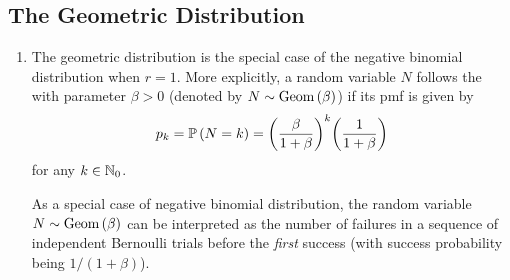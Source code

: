 \subsection{The Geometric Distribution}
\begin{enumerate}
\item The geometric distribution is the special case of the negative binomial
distribution when \(r=1\). More explicitly, a random variable \(N\) follows the
 with parameter \(\beta>0\) (denoted by
\(N\sim\operatorname{Geom}\left(\beta\right)\)) if its pmf is given by
\[
p_k=\mathbb{P}\left(N=k\right)=\qty(\frac{\beta}{1+\beta})^{k}\qty(\frac{1}{1+\beta})
\]
for any \(k\in\mathbb{N}_0\).

\begin{note}
As a special case of negative binomial distribution, the random variable
\(N\sim\operatorname{Geom}\left(\beta\right)\) can be interpreted as the number of failures in a sequence
of independent Bernoulli trials before the \emph{first} success (with success
probability being \(1/(1+\beta)\)).
\end{note}


\end{enumerate}

